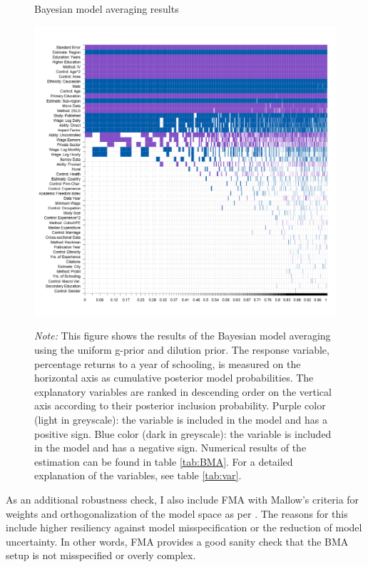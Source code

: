 \begin{figure}[!htbp]
\begin{center}
\caption{Bayesian model averaging results}
\label{fig:BMA}
\includegraphics[width=1\textwidth]{Figures/BMA/bma_UIP_dilut_results.png}
\end{center}\vspace{-0.5cm}
\captionsetup{width=0.95\textwidth, font = scriptsize}
\caption*{\emph{Note:} This figure shows the results of the Bayesian model averaging using the uniform g-prior and dilution prior. The response variable, percentage returns to a year of schooling, is measured on the horizontal axis as cumulative posterior model probabilities. The explanatory variables are ranked in descending order on the vertical axis according to their posterior inclusion probability. Purple color (light in greyscale): the variable is included in the model and has a positive sign. Blue color (dark in greyscale): the variable is included in the model and has a negative sign. Numerical results of the estimation can be found in table \ref{tab:BMA}. For a detailed explanation of the variables, see table \ref{tab:var}.
}
\end{figure}

As an additional robustness check, I also include \ac{FMA} with Mallow's criteria for weights \citep{hansen2007least} and orthogonalization of the model space as per \cite{amini2012comparison}. The reasons for this include higher resiliency against model misspecification or the reduction of model uncertainty. In other words, \ac{FMA} provides a good sanity check that the \ac{BMA} setup is not misspecified or overly complex.


